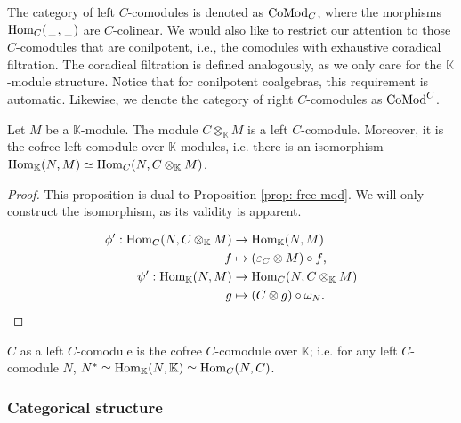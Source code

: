 \documentclass[../thesis.tex]{subfiles}
\begin{document}
                The category of left $C$-comodules is denoted as $\tt{CoMod}_C$, where the morphisms $\tt{Hom}_C(\argument,\argument)$ are $C$-colinear. We would also like to restrict our attention to those $C$-comodules that are conilpotent, i.e., the comodules with exhaustive coradical filtration. The coradical filtration is defined analogously, as we only care for the $\mathbb{K}$-module structure. Notice that for conilpotent coalgebras, this requirement is automatic. Likewise, we denote the category of right $C$-comodules as $\tt{CoMod}^C$.

                \begin{proposition}\label{prop: cofree-comod}
                    Let $M$ be a $\mathbb{K}$-module. The module $C\otimes_{\mathbb{K}}M$ is a left $C$-comodule. Moreover, it is the cofree left comodule over $\mathbb{K}$-modules, i.e. there is an isomorphism $\tt{Hom}_{\mathbb{K}}(N,M)\simeq \tt{Hom}_C(N,C\otimes_{\mathbb{K}}M)$. 
                \end{proposition}

                \begin{proof}
                    This proposition is dual to Proposition \ref{prop: free-mod}. We will only construct the isomorphism, as its validity is apparent.

                    \begin{align*}
                        \phi' : \tt{Hom}_C(N,C\otimes_\mathbb{K}M) & \rightarrow \tt{Hom}_\mathbb{K}(N,M) \\
                        f & \mapsto (\varepsilon_C \otimes M) \circ f\tt{,} \\
                        \psi' : \tt{Hom}_\mathbb{K}(N,M) & \rightarrow \tt{Hom}_C(N,C\otimes_\mathbb{K}M) \\
                        g & \mapsto (C \otimes g) \circ \omega_N\tt{.}
                    \end{align*}
                \end{proof}

                \begin{corollary}
                    $C$ as a left $C$-comodule is the cofree $C$-comodule over $\mathbb{K}$; i.e. for any left $C$-comodule $N$, $N^* \simeq \tt{Hom}_\mathbb{K}(N,\mathbb{K}) \simeq \tt{Hom}_C(N, C)$.
                \end{corollary}

            \subsubsection*{Categorical structure}
\end{document}
